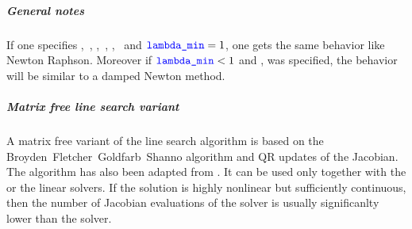 \subparagraph{General notes}
If one specifies ,~, ,~, ,~ and $\textcolor{blue}{\texttt{lambda\_min}}=1$, one gets the same behavior like Newton Raphson. Moreover if $\textcolor{blue}{\texttt{lambda\_min}}<1$ and ,  was specified, the behavior will be similar to a damped Newton method.

\subparagraph{Matrix free line search variant}
A matrix free variant of the line search algorithm is based on the Broyden~Fletcher~Goldfarb~Shanno
algorithm and QR updates of the Jacobian. The  algorithm has also been adapted from \cite{NUMERICAL-RECIPES-IN-C}.
It can be used only together with the  or the  linear solvers. If the solution is highly nonlinear but
sufficiently continuous, then the number of Jacobian evaluations of the  solver is usually significanlty lower
than the  solver.

